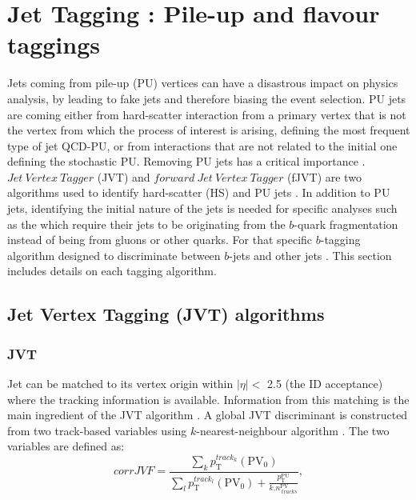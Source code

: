 \section{Jet Tagging : Pile-up and flavour taggings}
\label{Jet:Tag}
Jets coming from pile-up (PU) vertices can have a disastrous impact on physics analysis, by leading to fake jets and therefore biasing the event selection. PU jets are coming either from hard-scatter interaction from a primary vertex that is not the vertex from which the process of interest is arising, defining the most frequent type of jet QCD-PU, or from interactions that are not related to the initial one defining the stochastic PU. Removing PU jets has a critical importance \cite{Tagging_2013, Tagging_2014}. $Jet\ Vertex\ Tagger$ (JVT) and $forward \ Jet \ Vertex\ Tagger$ (fJVT) are two algorithms used to identify hard-scatter (HS) and PU jets \cite{JVT_2014, fJVT}. In addition to PU jets, identifying the initial nature of the jets is needed for specific analyses such as the \HHyybb which require their jets to be originating from the $b$-quark fragmentation instead of being from gluons or other quarks. For that specific $b$-tagging algorithm designed to discriminate between $b$-jets and other jets \cite{Light_Quark_Tagger}. This section includes details on each tagging algorithm. 

\subsection{Jet Vertex Tagging (JVT) algorithms}
\label{Jet:Tag:JVT}

\subsubsection{JVT}
\label{Jet:Tag:JVT:JVT}
Jet can be matched to its vertex origin within $|\eta|<$ 2.5 (the ID acceptance) where the tracking information is available. Information from this matching is the main ingredient of the JVT algorithm \cite{JVT_Perf}. A global JVT discriminant is constructed from two track-based variables using $k$-nearest-neighbour algorithm \cite{kNN}. The two variables are defined as: 
\begin{equation}
    corrJVF=\frac{\sum_{k} p_{\mathrm{T}}^{ {track
    }_{k}}\left(\mathrm{PV}_{0}\right)}{\sum_{l} p_{\mathrm{T}}^{{track
    }_{l}}\left(\mathrm{PV}_{0}\right)+\frac{p_{\mathrm{T}}^{\mathrm{PU}}}{k . n_{\ {tracks }}^{\mathrm{PV}}}},
\end{equation}

